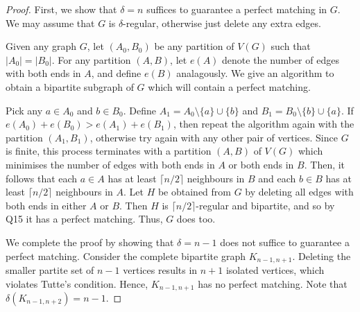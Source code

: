 \begin{proof}
First, we show that \( \delta = n \) suffices to guarantee a perfect matching in \( G \). We may assume that \( G \) is \( \delta  \)-regular, otherwise just delete any extra edges.

Given any graph \( G \), let \( (A_0,B_0) \) be any partition of \( V(G) \) such that \( |A_0| = |B_0| \). For any partition \( (A,B) \), let \( e(A) \) denote the number of edges with both ends in \( A \), and define \( e(B) \) analagously. We give an algorithm to obtain a bipartite subgraph of \( G \) which will contain a perfect matching.

Pick any \( a \in A_0 \) and \( b \in B_0 \). Define \( A_1 = A_0 \setminus \{ a \} \cup \{ b \}  \) and \( B_1 = B_0 \setminus \{ b \} \cup \{ a \}  \). If \( e(A_0) + e(B_0) > e(A_1) + e(B_1) \), then repeat the algorithm again with the partition \( (A_1, B_1) \), otherwise try again with any other pair of vertices. Since \( G \) is finite, this process terminates with a partition \( (A,B) \) of \( V(G) \) which minimises the number of edges with both ends in \( A \) or both ends in \( B \). Then, it follows that each \( a \in A \) has at least \( \lceil n / 2 \rceil \) neighbours in \( B \) and each \( b \in B \) has at least \( \lceil n / 2 \rceil \) neighbours in \( A \). Let \( H \) be obtained from \( G \) by deleting all edges with both ends in either \( A \) or \( B \). Then \( H \) is \( \lceil n/2 \rceil \)-regular and bipartite, and so by Q15 it has a perfect matching. Thus, \( G \) does too.

We complete the proof by showing that \( \delta = n - 1 \) does not suffice to guarantee a perfect matching. Consider the complete bipartite graph \( K_{n-1, n+1}  \). Deleting the smaller partite set of \( n - 1 \) vertices results in \( n + 1 \) isolated vertices, which violates Tutte's condition. Hence, \( K_{n-1, n+1}  \) has no perfect matching. Note that \( \delta (K_{n-1, n+2}) = n - 1 \).
\end{proof}

